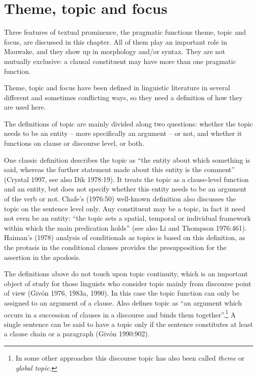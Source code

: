 
\chapter{Theme, topic and focus}
\hypertarget{RefHeading23761935131865}{}
Three features of textual prominence, the pragmatic functions theme, topic and focus, are discussed in this chapter.  All of them play an important role in Mauwake, and they show up in morphology and/or syntax. They are not mutually exclusive: a clausal constituent may have more than one pragmatic function. 

Theme, topic and focus have been defined in linguistic literature in several different and sometimes conflicting ways, so they need a definition of how they are used here. 

The definitions of topic are mainly divided along two questions: whether the topic needs to be an entity -- more specifically an argument -- or not, and whether it functions on clause or discourse level, or both. 

One classic definition describes the topic as ``the entity about which something is said, whereas the further statement made about this entity is the comment'' (Crystal 1997, see also Dik 1978:19). It treats the topic as a clause-level function and an entity, but does not specify whether this entity needs to be an argument of the verb or not.  Chafe's (1976:50) well-known definition also discusses the topic on the sentence level only. Any constituent may be a topic, in fact it need not even be an entity: ``the topic sets a spatial, temporal or individual framework within which the main predication holds'' (see also Li and Thompson 1976:461). Haiman's (1978) analysis of conditionals as topics is based on this definition, as the protasis in the conditional clauses provides the presupposition for the assertion in the apodosis.

The definitions above do not touch upon topic continuity, which is an important  object of study for those linguists who consider topic mainly from discourse point of view (Giv\'on 1976, 1983a, 1990).  In this case the topic function can only be assigned to an argument of a clause. Also \citet[340]{Dixon2010a} defines topic as ``an argument which occurs in a succession of clauses in a discourse and binds them together''.\footnote{In some other approaches this discourse topic has also been called \textit{theme} or \textit{global topic}.} A single sentence can be said to have a topic only if the sentence constitutes at least a clause chain or a paragraph (Giv\'on 1990:902). 

